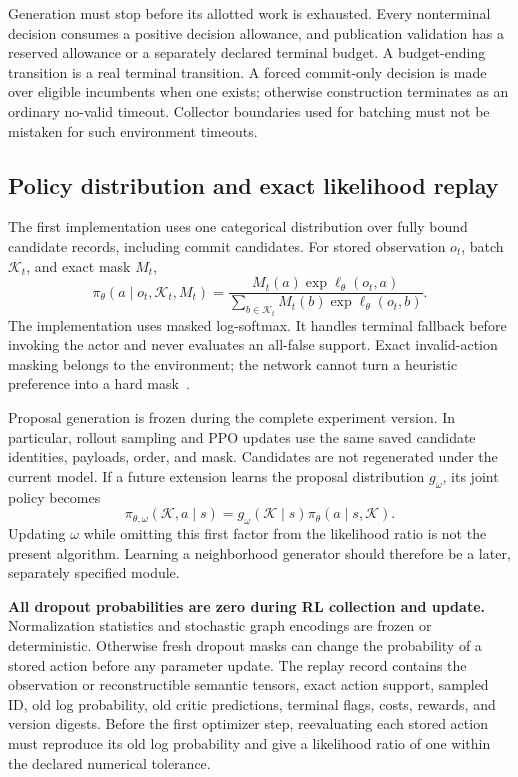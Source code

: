 \documentclass[11pt,a4paper]{article}
\theoremstyle{definition}\newtheorem{definition}[proposition]{Definition}
\begin{document}
Generation must stop before its allotted work is exhausted. Every nonterminal decision consumes a
positive decision allowance, and publication validation has a reserved allowance or a separately
declared terminal budget. A budget-ending transition is a real terminal transition. A forced
commit-only decision is made over eligible incumbents when one exists; otherwise construction
terminates as an ordinary no-valid timeout. Collector boundaries used for batching must not be
mistaken for such environment timeouts.

\subsection{Policy distribution and exact likelihood replay}

The first implementation uses one categorical distribution over fully bound candidate records,
including commit candidates. For stored observation \(o_t\), batch \(\mathcal K_t\), and exact mask
\(M_t\),
\begin{equation}
 \pi_\theta(a\mid o_t,\mathcal K_t,M_t)=
 \frac{M_t(a)\exp\ell_\theta(o_t,a)}
 {\sum_{b\in\mathcal K_t}M_t(b)\exp\ell_\theta(o_t,b)}.
 \label{eq:rl-flat-policy}
\end{equation}
The implementation uses masked log-softmax. It handles terminal fallback before invoking the actor
and never evaluates an all-false support. Exact invalid-action masking belongs to the environment;
the network cannot turn a heuristic preference into a hard mask~\cite{masking2020}.

Proposal generation is frozen during the complete experiment version. In particular, rollout
sampling and PPO updates use the same saved candidate identities, payloads, order, and mask.
Candidates are not regenerated under the current model. If a future extension learns the proposal
distribution \(g_\omega\), its joint policy becomes
\begin{equation}
 \pi_{\theta,\omega}(\mathcal K,a\mid s)
 =g_\omega(\mathcal K\mid s)\pi_\theta(a\mid s,\mathcal K).
\end{equation}
Updating \(\omega\) while omitting this first factor from the likelihood ratio is not the present
algorithm. Learning a neighborhood generator should therefore be a later, separately specified
module.

\textbf{All dropout probabilities are zero during RL collection and update.} Normalization
statistics and stochastic graph encodings are frozen or deterministic. Otherwise fresh dropout
masks can change the probability of a stored action before any parameter update. The replay record
contains the observation or reconstructible semantic tensors, exact action support, sampled ID,
old log probability, old critic predictions, terminal flags, costs, rewards, and version digests.
Before the first optimizer step, reevaluating each stored action must reproduce its old log
probability and give a likelihood ratio of one within the declared numerical tolerance.
\end{document}
